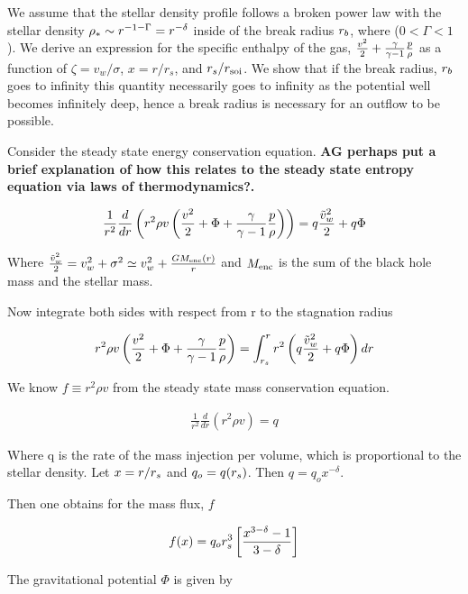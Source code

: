 We assume that the stellar density profile follows a broken power law
with the stellar density $\rho_*\sim r^{-1-\Gamma}= r^{-\delta}$ inside of the
break radius $r_b$, where ($0<\Gamma<1$). We derive an expression for
the specific enthalpy of the gas, $\frac{v^2}{2} +\frac{\gamma}{\gamma-1} \frac{p}{\rho}$ as a
function of $\zeta=v_w/\sigma$, $x=r/r_s$, and $r_s/r_{\rm soi}$. We show
that if the break radius, $r_b$ goes to infinity this quantity
necessarily goes to infinity as the potential well becomes infinitely
deep, hence a break radius is necessary for an outflow to be possible.

Consider the steady state energy conservation equation. {\bf AG perhaps
  put a brief explanation of how this relates to the steady state
  entropy equation via laws of thermodynamics?.}

\begin{align}
\frac{1}{r^2} \frac{d}{dr} \left(r^2 \rho v \left(\frac{v^2}{2} + \Phi
    + \frac{\gamma}{\gamma-1} \frac{p}{\rho}\right) \right) = q \frac{\tilde{v}_{w}^2}{2} + q \Phi
\label{eq:enCons}
\end{align}

Where $\frac{\tilde{v}_{w}^2}{2}=v_w^2+\sigma^2\simeq v_w^2+\frac{G M_{\rm enc}(r)}{r}$ and
$M_{\rm enc}$ is the sum of the black hole mass and the stellar mass.

Now integrate both sides with respect from r to the stagnation radius 

\begin{align}
  r^2 \rho v \left(\frac{v^2}{2}+\Phi+\frac{\gamma}{\gamma-1} \frac{p}{\rho} \right)= \int_{r_s}^{r}
    r^2 \left(q \frac{\tilde{v}_{w}^2}{2} + q\Phi\right) dr
    \label{eq:enConsInt}
\end{align}

We know $f\equiv r^2 \rho v$ from the steady state mass conservation
equation. 

\begin{align}
 \frac{1}{r^2} \frac{d}{dr} \left(r^2 \rho v\right) = q 
\end{align}

Where q is the rate of the mass injection per volume, which is
proportional to the stellar density. Let $x=r/r_s$ and $q_o= q
(r_s)$. Then $q=q_o x^{-\delta}$. 

Then one obtains for the mass flux, $f$ 

\begin{align}
 f(x)=q_o r_s^3 \left[\frac{x^{3-\delta}-1}{3-\delta}\right]
 \label{eq:massFlux}
\end{align}

The gravitational potential $\Phi$ is given by

